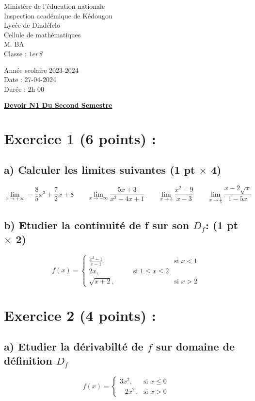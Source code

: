 \documentclass{article}
\begin{document}
\begin{minipage}{0.5\textwidth}
	Ministère de l'éducation nationale  \\
	Inspection académique de Kédougou   \\
	Lycée de Dindéfelo            \\
	Cellule de mathématiques            \\
	M. BA                          \\
	Classe : $1erS$  \\
\end{minipage}
\begin{minipage}{0.5\textwidth}
	Année scolaire 2023-2024 \\
	Date : 27-04-2024 \\
	Durée : 2h 00 \\
\end{minipage}

\begin{center}
	\textbf{{\underline{Devoir N1 Du Second Semestre}}}
\end{center}

\section*{Exercice 1 (6 points) :}
\subsection*{a) Calculer les limites suivantes (1 pt $\times$ 4)}
\[ \lim_{x \to +\infty}-\frac{8}{5}x^{3}+\frac{7}{2}x+8\quad\quad \lim_{x \to -\infty}\frac{5x+3}{x^{2}-4x+1}\quad\quad \lim_{x \to 3}\frac{x^{2}-9}{x-3}\quad\quad \lim_{x \to \frac{1}{5}}\frac{x-2\sqrt{x}}{1-5x} \]
\subsection*{b) Etudier la continuité de f sur son $D_{f}$: (1 pt $\times$ 2)}
\[ f(x) = \begin{cases} 
  \frac{x^2-1}{x-1}, & \text{si } x < 1 \\
   2x,\quad\quad\quad\quad\quad \text{si } 1 \leq x \leq 2\\
  \sqrt{x+2}, & \text{si } x > 2
\end{cases} \]
\section*{Exercice 2 (4 points) :}
\subsection*{a) Etudier la dérivabilté de $f$ sur domaine de définition $D_{f}$}
\[ f(x) = \begin{cases} 
  3x^{2}, & \text{si } x \leq 0 \\
  -2x^{2}, & \text{si } x > 0 
\end{cases} \]
\end{document}
